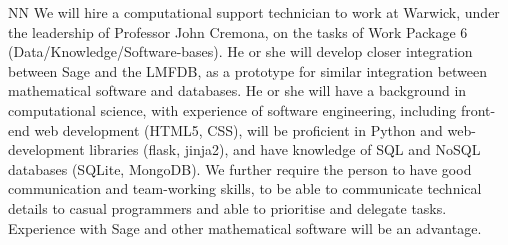 \begin{participant}[type=R, PM=24]{NN}
  We will hire a computational support technician to work at Warwick,
  under the leadership of Professor John Cremona, on the tasks of Work
  Package 6 (Data/Knowledge/Software-bases).  He or she will develop
  closer integration between Sage and the LMFDB, as a prototype for
  similar integration between mathematical software and databases.  He
  or she will have a background in computational science, with
  experience of software engineering, including front-end web
  development (HTML5, CSS), will be proficient in Python and
  web-development libraries (flask, jinja2), and have knowledge of SQL
  and NoSQL databases (SQLite, MongoDB). We further require the person
  to have good communication and team-working skills, to be able to
  communicate technical details to casual programmers and able to
  prioritise and delegate tasks.  Experience with Sage and other
  mathematical software will be an advantage.
\end{participant}
